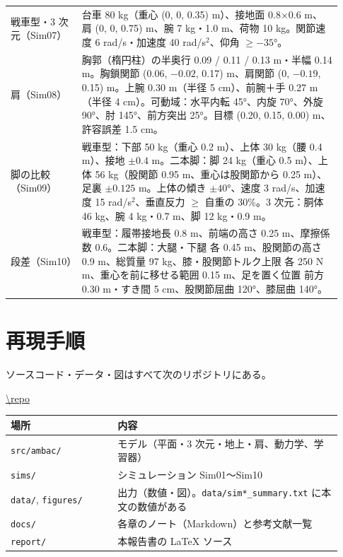 \begin{longtable}{p{0.20\linewidth}p{0.73\linewidth}}
戦車型・3 次元（Sim07） & 台車 80 kg（重心 (0, 0, 0.35) m）、接地面 0.8×0.6 m、肩 (0, 0, 0.75) m、腕 7 kg・1.0 m、荷物 10 kg。関節速度 6 rad/s・加速度 40 rad/s$^2$、仰角 $\ge -35$°。 \\
肩（Sim08） & 胸郭（楕円柱）の半奥行 0.09 / 0.11 / 0.13 m・半幅 0.14 m。胸鎖関節 (0.06, $-0.02$, 0.17) m、肩関節 (0, $-0.19$, 0.15) m。上腕 0.30 m（半径 5 cm）、前腕＋手 0.27 m（半径 4 cm）。可動域：水平内転 45°、内旋 70°、外旋 90°、肘 145°、前方突出 25°。目標 (0.20, 0.15, 0.00) m、許容誤差 1.5 cm。 \\
脚の比較（Sim09） & 戦車型：下部 50 kg（重心 0.2 m）、上体 30 kg（腰 0.4 m）、接地 $\pm0.4$ m。二本脚：脚 24 kg（重心 0.5 m）、上体 56 kg（股関節 0.95 m、重心は股関節から 0.25 m）、足裏 $\pm0.125$ m。上体の傾き $\pm40$°、速度 3 rad/s、加速度 15 rad/s$^2$、垂直反力 $\ge$ 自重の 30\%。3 次元：胴体 46 kg、腕 4 kg・0.7 m、脚 12 kg・0.9 m。 \\
段差（Sim10） & 戦車型：履帯接地長 0.8 m、前端の高さ 0.25 m、摩擦係数 0.6。二本脚：大腿・下腿 各 0.45 m、股関節の高さ 0.9 m、総質量 97 kg、膝・股関節トルク上限 各 250 N\,m、重心を前に移せる範囲 0.15 m、足を置く位置 前方 0.30 m・すき間 5 cm、股関節屈曲 120°、膝屈曲 140°。 \\
\bottomrule
\end{longtable}

\section{再現手順}

ソースコード・データ・図はすべて次のリポジトリにある。

\begin{center}\url{\repo}\end{center}

\begin{longtable}{p{0.30\linewidth}p{0.63\linewidth}}
\toprule
場所 & 内容 \\ \midrule \endhead
\texttt{src/ambac/} & モデル（平面・3 次元・地上・肩、動力学、学習器） \\
\texttt{sims/} & シミュレーション Sim01〜Sim10 \\
\texttt{data/}, \texttt{figures/} & 出力（数値・図）。\texttt{data/sim*\_summary.txt} に本文の数値がある \\
\texttt{docs/} & 各章のノート（Markdown）と参考文献一覧 \\
\texttt{report/} & 本報告書の \LaTeX{} ソース \\
\bottomrule
\end{longtable}

